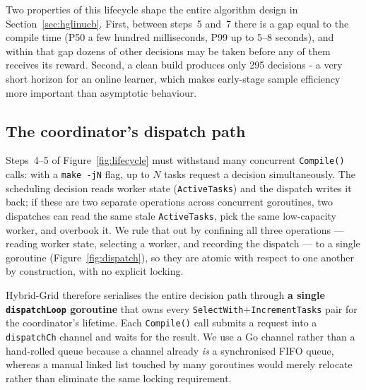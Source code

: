 \documentclass[final,5p,times,twocolumn]{elsarticle}
\begin{document}
Two properties of this lifecycle shape the entire algorithm design in Section~\ref{sec:hglinucb}. First, between steps~5 and~7 there is a gap equal to the compile time (P50 a few hundred milliseconds, P99 up to 5--8 seconds), and within that gap dozens of other decisions may be taken before any of them receives its reward. Second, a clean build produces only 295 decisions - a very short horizon for an online learner, which makes early-stage sample efficiency more important than asymptotic behaviour.

\subsection{The coordinator's dispatch path}
\label{sec:dispatch}

Steps~4--5 of Figure~\ref{fig:lifecycle} must withstand many concurrent \texttt{Compile()} calls: with a \texttt{make -jN} flag, up to $N$ tasks request a decision simultaneously. The scheduling decision reads worker state (\texttt{ActiveTasks}) and the dispatch writes it back; if these are two separate operations across concurrent goroutines, two dispatches can read the same stale \texttt{ActiveTasks}, pick the same low-capacity worker, and overbook it. We rule that out by confining all three operations --- reading worker state, selecting a worker, and recording the dispatch --- to a single goroutine (Figure~\ref{fig:dispatch}), so they are atomic with respect to one another by construction, with no explicit locking.

Hybrid-Grid therefore serialises the entire decision path through \textbf{a single \texttt{dispatchLoop} goroutine} that owns every \texttt{SelectWith}+\texttt{IncrementTasks} pair for the coordinator's lifetime. Each \texttt{Compile()} call submits a request into a \texttt{dispatchCh} channel and waits for the result. We use a Go channel rather than a hand-rolled queue because a channel already \emph{is} a synchronised FIFO queue, whereas a manual linked list touched by many goroutines would merely relocate rather than eliminate the same locking requirement.
\end{document}
